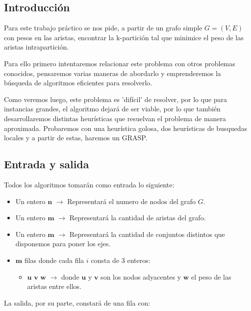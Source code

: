 \subsection{Introducción}

Para este trabajo práctico se nos pide, a partir de un grafo simple $G=(V,E)$ con pesos en las aristas, encontrar la k-partición tal que minimice el peso de las aristas intrapartición.

Para ello primero intentaremos relacionar este problema con otros problemas conocidos, pensaremos varias maneras de abordarlo y emprenderemos la búsqueda de algoritmos eficientes para resolverlo.

Como veremos luego, este problema es 'difícil' de resolver, por lo que para instancias grandes, el algoritmo dejará de ser viable, por lo que también desarrollaremos distintas heurísticas que resuelvan el problema de manera aproximada. Probaremos con una heurística golosa, dos heurísticas de busquedas locales y a partir de estas, haremos un GRASP.

\subsection{Entrada y salida}

Todos los algoritmos tomarán como entrada lo siguiente:

\begin{itemize}
	\item Un entero $\textbf{n}$ $\rightarrow$ Representará el numero de nodos del grafo $G$.

	\item Un entero $\textbf{m}$ $\rightarrow$ Representará la cantidad de aristas del grafo.

	\item Un entero $\textbf{m}$ $\rightarrow$ Representará la cantidad de conjuntos distintos que disponemos para poner los ejes.

	\item $\textbf{m}$ filas donde cada fila $i$ consta de $3$ enteros:
	\begin{itemize}
		\item $\textbf{u v w}$ $ \rightarrow $ donde $\textbf{u}$ y $\textbf{v}$ son los nodos adyacentes y $\textbf{w}$ el peso de las aristas entre ellos.
	\end{itemize}
\end{itemize}

La salida, por su parte, constar\'a de una fila con:

